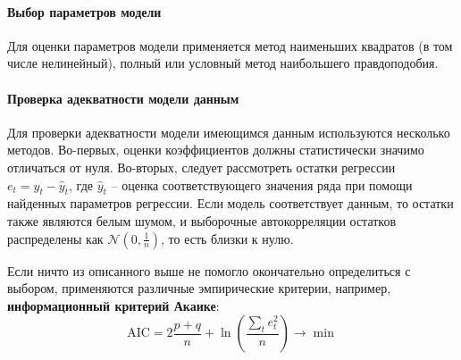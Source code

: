 \paragraph{Выбор параметров модели}

Для оценки параметров модели применяется метод наименьших квадратов (в том числе нелинейный), полный или условный метод наибольшего правдоподобия.

\paragraph{Проверка адекватности модели данным}

Для проверки адекватности модели имеющимся данным используются несколько методов.
Во-первых, оценки коэффициентов должны статистически значимо отличаться от нуля.
Во-вторых, следует рассмотреть остатки регрессии $e_t = y_t - \hat{y}_t$, где $\hat{y}_t$ -- оценка соответствующего значения ряда при помощи найденных параметров регрессии.
Если модель соответствует данным, то остатки также являются белым шумом, и выборочные автокорреляции остатков распределены как $\mathcal{N}\left( 0, \frac{1}{n} \right)$, то есть близки к нулю.

Если ничто из описанного выше не помогло окончательно определиться с выбором,  %
применяются различные эмпирические критерии, например, \textbf{информационный критерий Акаике}:
\begin{equation*}
    \mathrm{AIC} = 2 \frac{p+q}{n} + \ln \left( \frac{\sum_t e_t^2}{n} \right) \to \min
\end{equation*}

